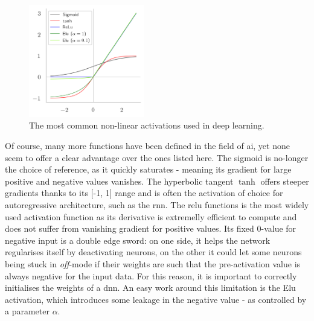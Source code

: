 \begin{figure}
    \begin{center}
        \includegraphics[width=0.45\textwidth]{Images/ML/activations.png}
        \caption{The most common non-linear activations used in deep learning.} 
        \label{fig:commonAct}
    \end{center}
\end{figure}
Of course, many more functions have been defined in the field of \gls{ai}, yet none seem to offer a clear advantage over the ones listed here. The sigmoid is no-longer the choice of reference, as it quickly saturates - meaning its gradient for large positive and negative values vanishes. The hyperbolic tangent $\tanh$ offers steeper gradients thanks to its [-1, 1] range and is often the activation of choice for autoregressive architecture, such as the \gls{rnn}. The \gls{relu} functions is the most widely used activation function as its derivative is extremelly efficient to compute and does not suffer from vanishing gradient for positive values. Its fixed 0-value for negative input is a double edge sword: on one side, it helps the network regularises itself by deactivating neurons, on the other it could let some neurons being stuck in \textit{off}-mode if their weights are such that the pre-activation value is always negative for the input data. For this reason, it is important to correctly initialises the weights of a \gls{dnn}. An easy work around this limitation is the Elu activation, which introduces some leakage in the negative value - as controlled by a parameter $\alpha$.\\
